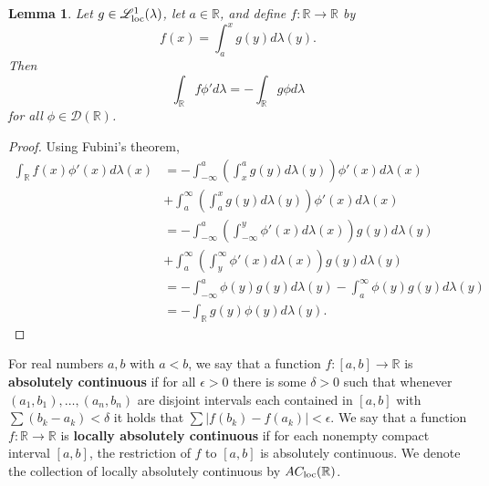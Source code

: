 \documentclass{article}
\newcommand{\Lsemiloc}{\mathscr{L}_{\ensuremath\mathrm{loc}}^1(\lambda)}
\newcommand{\ACloc}{AC_{\ensuremath\mathrm{loc}}(\mathbb{R})}
\newtheorem{lemma}[theorem]{Lemma}
\theoremstyle{definition}
\begin{document}
\begin{lemma}
Let $g \in \Lsemiloc$, let $a \in \mathbb{R}$, and define $f:\mathbb{R} \to \mathbb{R}$ by
\[
f(x) = \int_a^x g(y) d\lambda(y).
\]
Then
\[
\int_\mathbb{R} f \phi' d\lambda = - \int_\mathbb{R} g \phi d\lambda
\]
for all $\phi \in \mathscr{D}(\mathbb{R})$.
\label{parts}
\end{lemma}
\begin{proof}
Using Fubini's theorem,
\begin{align*}
\int_\mathbb{R} f(x) \phi'(x) d\lambda(x)&=-\int_{-\infty}^a \left( \int_x^a g(y) d\lambda(y) \right)
\phi'(x) d\lambda(x)\\
&+\int_a^\infty \left(  \int_a^x g(y) d\lambda(y) \right)
\phi'(x) d\lambda(x)\\
&=-\int_{-\infty}^a \left( \int_{-\infty}^y \phi'(x) d\lambda(x) \right) g(y) d\lambda(y)\\
&+\int_a^\infty \left( \int_y^\infty \phi'(x) d\lambda(x) \right) g(y) d\lambda(y)\\
&=-\int_{-\infty}^a \phi(y)  g(y) d\lambda(y)
-\int_a^\infty \phi(y) g(y) d\lambda(y)\\
&=-\int_\mathbb{R} g(y) \phi(y) d\lambda(y).
\end{align*}
\end{proof}


For real numbers $a,b$ with $a < b$, we say that a function $f:[a,b] \to \mathbb{R}$ 
is \textbf{absolutely continuous} if for all $\epsilon>0$ there is some $\delta>0$ such that
whenever $(a_1,b_1),\ldots,(a_n,b_n)$ are disjoint intervals each contained in $[a,b]$ with
$\sum (b_k-a_k)<\delta$ it holds that $\sum |f(b_k)-f(a_k)|<\epsilon$. We say that a function $f:\mathbb{R} \to \mathbb{R}$
is \textbf{locally absolutely continuous} if for each nonempty compact interval $[a,b]$, the restriction of $f$ to $[a,b]$ is absolutely
continuous. We denote the collection of locally absolutely continuous by $\ACloc$.
\end{document}
